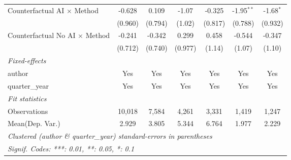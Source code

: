 \begin{tabular}{lcccccc}
   Counterfactual AI $\times$ Method     & -0.628        & 0.109         & -1.07         & -0.325        & -1.95$^{**}$  & -1.68$^{*}$\\   
                                         & (0.960)       & (0.794)       & (1.02)        & (0.817)       & (0.788)       & (0.932)\\   
   Counterfactual No AI $\times$ Method  & -0.241        & -0.342        & 0.299         & 0.458         & -0.544        & -0.347\\   
                                         & (0.712)       & (0.740)       & (0.977)       & (1.14)        & (1.07)        & (1.10)\\   
   \midrule
   \emph{Fixed-effects}\\
   author                                & Yes           & Yes           & Yes           & Yes           & Yes           & Yes\\  
   quarter\_year                         & Yes           & Yes           & Yes           & Yes           & Yes           & Yes\\  
   \midrule
   \emph{Fit statistics}\\
   Observations                          & 10,018        & 7,584         & 4,261         & 3,331         & 1,419         & 1,247\\  
Mean(Dep. Var.) & 2.929 & 3.805 & 5.344 & 6.764 & 1.977 & 2.229 \\
   \midrule \midrule
   \multicolumn{7}{l}{\emph{Clustered (author \& quarter\_year) standard-errors in parentheses}}\\
   \multicolumn{7}{l}{\emph{Signif. Codes: ***: 0.01, **: 0.05, *: 0.1}}\\
\end{tabular}
\par\endgroup
